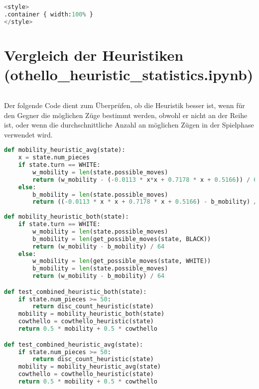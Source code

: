 \begin{lstlisting}[language=Python]
%%HTML
<style>
.container { width:100% }
</style>
\end{lstlisting}

\hypertarget{vergleich-der-heuristiken-othello_heuristic_statistics.ipynb}{%
\section{Vergleich der Heuristiken
(othello\_heuristic\_statistics.ipynb)}\label{vergleich-der-heuristiken-othello_heuristic_statistics.ipynb}}

\begin{lstlisting}[language=Python]
%run othello_test_util.ipynb
\end{lstlisting}

Der folgende Code dient zum Überprüfen, ob die Heuristik besser ist,
wenn für den Gegner die möglichen Züge bestimmt werden, obwohl er nicht
an der Reihe ist, oder wenn die durchschnittliche Anzahl an möglichen
Zügen in der Spielphase verwendet wird.

\begin{lstlisting}[language=Python]
def mobility_heuristic_avg(state):
    x = state.num_pieces
    if state.turn == WHITE:
        w_mobility = len(state.possible_moves)
        return (w_mobility - (-0.0113 * x*x + 0.7178 * x + 0.5166)) / 64
    else:
        b_mobility = len(state.possible_moves)
        return ((-0.0113 * x * x + 0.7178 * x + 0.5166) - b_mobility) / 64
    
def mobility_heuristic_both(state):
    if state.turn == WHITE:
        w_mobility = len(state.possible_moves)
        b_mobility = len(get_possible_moves(state, BLACK))
        return (w_mobility - b_mobility) / 64
    else:
        w_mobility = len(get_possible_moves(state, WHITE))
        b_mobility = len(state.possible_moves)
        return (w_mobility - b_mobility) / 64

def test_combined_heuristic_both(state):
    if state.num_pieces >= 50:
        return disc_count_heuristic(state)
    mobility = mobility_heuristic_both(state)
    cowthello = cowthello_heuristic(state)
    return 0.5 * mobility + 0.5 * cowthello

def test_combined_heuristic_avg(state):
    if state.num_pieces >= 50:
        return disc_count_heuristic(state)
    mobility = mobility_heuristic_avg(state)
    cowthello = cowthello_heuristic(state)
    return 0.5 * mobility + 0.5 * cowthello
\end{lstlisting}

